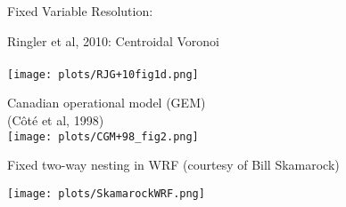 \begin{slide}{Fixed Variable Resolution:}
\vspace{20pt}

\begin{minipage}{0.49\linewidth}\begin{list0}
\item
Ringler et al, 2010: Centroidal Voronoi\\ \ \\
\texttt{[image: plots/RJG+10fig1d.png]}
\end{list0}\end{minipage}
%
\begin{minipage}{0.49\linewidth}\begin{list0}
\item Canadian operational model (GEM)\\(C\^{o}t\'{e} et al, 1998) \\
\texttt{[image: plots/CGM+98\_fig2.png]}
\end{list0}\end{minipage}

\begin{minipage}{0.25\linewidth}
\begin{list0}
\item Fixed two-way nesting in WRF (courtesy of Bill Skamarock)
\end{list0}
\end{minipage}
%
\begin{minipage}{0.7\linewidth}
\texttt{[image: plots/SkamarockWRF.png]}
\end{minipage}

\end{slide}

